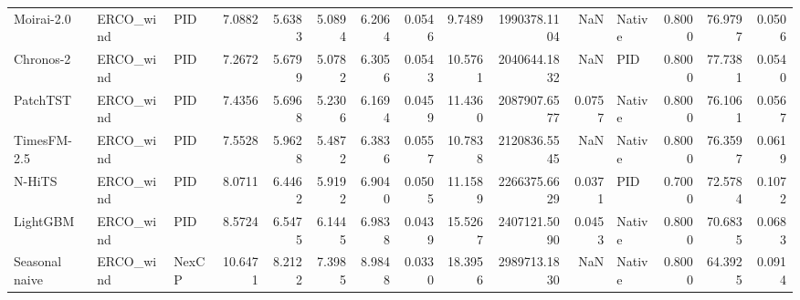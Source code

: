 \begin{tabular}{lllrrrrrrrrlrrr}
Moirai-2.0 & ERCO_wind & PID & 7.0882 & 5.6383 & 5.0894 & 6.2064 & 0.0546 & 9.7489 & 1990378.1104 & NaN & Native & 0.8000 & 76.9797 & 0.0506 \\
Chronos-2 & ERCO_wind & PID & 7.2672 & 5.6799 & 5.0782 & 6.3056 & 0.0543 & 10.5761 & 2040644.1832 & NaN & PID & 0.8000 & 77.7381 & 0.0540 \\
PatchTST & ERCO_wind & PID & 7.4356 & 5.6968 & 5.2306 & 6.1694 & 0.0459 & 11.4360 & 2087907.6577 & 0.0757 & Native & 0.8000 & 76.1061 & 0.0567 \\
TimesFM-2.5 & ERCO_wind & PID & 7.5528 & 5.9628 & 5.4872 & 6.3836 & 0.0557 & 10.7838 & 2120836.5545 & NaN & Native & 0.8000 & 76.3597 & 0.0619 \\
N-HiTS & ERCO_wind & PID & 8.0711 & 6.4462 & 5.9192 & 6.9040 & 0.0505 & 11.1589 & 2266375.6629 & 0.0371 & PID & 0.7000 & 72.5784 & 0.1072 \\
LightGBM & ERCO_wind & PID & 8.5724 & 6.5475 & 6.1445 & 6.9838 & 0.0439 & 15.5267 & 2407121.5090 & 0.0453 & Native & 0.8000 & 70.6835 & 0.0683 \\
Seasonal naive & ERCO_wind & NexCP & 10.6471 & 8.2122 & 7.3985 & 8.9848 & 0.0330 & 18.3956 & 2989713.1830 & NaN & Native & 0.8000 & 64.3925 & 0.0914 \\
\bottomrule
\end{tabular}
